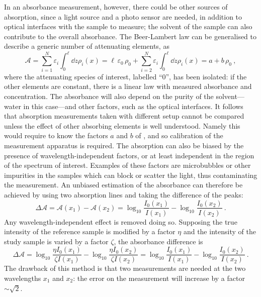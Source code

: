 In an absorbance measurement, however, there could be other sources of absorption, %
since a light source and a photo sensor are needed, in addition to optical interfaces with the %
sample to measure; the solvent of the sample can also contribute to the overall absorbance.
The Beer-Lambert law can be generalised to describe a generic number of attenuating elements, %
as 
\begin{equation}
	\label{eq:linear_bl}
	\mathcal{A} = \sum_{i = 1}^N \varepsilon_i \int_0^\ell \dd{z} \rho_i (x) = %
	\ell\,\varepsilon_0\,\rho_0 +  \sum_{i = 2}^N \varepsilon_i \int_0^\ell \dd{z} \rho_i (x) = a + b \, \rho_0\ ,
\end{equation}
where the attenuating species of interest, labelled ``0'', has been isolated: %
if the other elements are constant, there is a linear law with measured absorbance and concentration.
The absorbance will also depend on the purity of the solvent---water in this case---and other factors, %
such as the optical interfaces.
It follows that absorption measurements taken with different setup cannot be compared unless the %
effect of other absorbing elements is well understood.
Namely this would require to know the factors $a$ and $b$ of , %
and so calibration of the measurement apparatus is required.
The absorption can also be biased by the presence of wavelength-independent factors, %
or at least independent in the region of the spectrum of interest.
Examples of these factors are microbubbles or other impurities in the samples which %
can block or scatter the light, thus contaminating the measurement. %
An unbiased estimation of the absorbance can therefore be achieved by using two absorption lines %
and taking the difference of the peaks: %
\begin{equation}
	\Delta \mathcal{A} = \mathcal{A}(x_1) - \mathcal{A}(x_2) = %
	\log_{10} \frac{I_0 (x_1)}{I(x_1)} - \log_{10} \frac{I_0 (x_2)}{I(x_2)}\ .
\end{equation}
Any wavelength-independent effect is removed doing so.
Supposing the true intensity of the reference sample is modified by a factor $\eta$ %
and the intensity of the study sample is varied by a factor $\zeta$, the absorbance difference is
\begin{equation}
	\Delta \mathcal{A} = %
	\log_{10} \frac{\eta I_0 (x_1)}{\zeta I(x_1)} - \log_{10} \frac{\eta I_0 (x_2)}{\zeta I(x_2)} = %
	\log_{10} \frac{I_0 (x_1)}{I(x_1)} - \log_{10} \frac{I_0 (x_2)}{I(x_2)}\ .
\end{equation}
The drawback of this method is that two measurements are needed at the two wavelengths $x_1$ and $x_2$: 
the error on the measurement will increase by a factor~$\sim\sqrt{2}$.



